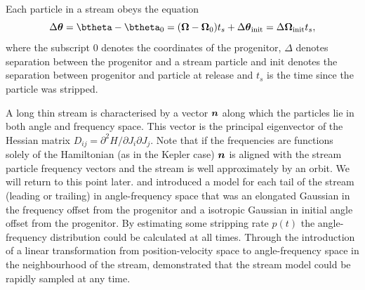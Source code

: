 \documentclass[useAMS,usenatbib,fleqn,a4paper]{mn2e}
\newcommand{\bs}[1]{\bmath{#1}}
\begin{document}
Each particle in a stream obeys the equation
\begin{equation}
\Delta\bs{\theta} = \btheta-\btheta_0 = (\boldsymbol{\Omega}-\boldsymbol{\Omega}_0)t_s +\Delta\bs{\theta}_\mathrm{init}= \Delta\bs{\Omega}_\mathrm{init}t_s,
\end{equation}
where the subscript $0$ denotes the coordinates of the progenitor, $\Delta$ denotes separation between the progenitor and a stream particle and $\mathrm{init}$ denotes the separation between progenitor and particle at release and $t_s$ is the time since the particle was stripped.

A long thin stream is characterised by a vector $\bs{n}$ along which the particles lie in both angle and frequency space. This vector is the principal eigenvector of the Hessian matrix $D_{ij}=\partial^2 H/\partial J_i\partial J_j$. Note that if the frequencies are functions solely of the Hamiltonian (as in the Kepler case) $\bs{n}$ is aligned with the stream particle frequency vectors and the stream is well approximately by an orbit. We will return to this point later. \cite{Bovy2014} and \cite{Sanders2014} introduced a model for each tail of the stream (leading or trailing) in angle-frequency space that was an elongated Gaussian in the frequency offset from the progenitor and a isotropic Gaussian in initial angle offset from the progenitor. By estimating some stripping rate $p(t)$ the angle-frequency distribution could be calculated at all times. Through the introduction of a linear transformation from position-velocity space to angle-frequency space in the neighbourhood of the stream, \cite{Bovy2014} demonstrated that the stream model could be rapidly sampled at any time.
\end{document}
